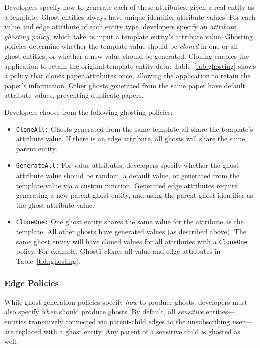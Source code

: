 Developers specify how to generate each of these attributes, given a real entity as a template.
Ghost entities always have unique identifier attribute values.
For each value and edge attribute of each entity type, developers specify an \emph{attribute ghosting policy},
which take as input a template entity's attribute value. Ghosting policies determine whether the
template value should be \emph{cloned} in one or all ghost entities, or whether
a new value should be generated. Cloning enables the application to retain
the original template entity data: Table~\ref{tab:ghosting} shows a policy that clones
paper attributes once, allowing the application to retain the paper's information. Other ghosts
generated from the same paper have default attribute values, preventing duplicate papers.

Developers choose from the following ghosting policies:
\begin{itemize}
    \item \texttt{CloneAll:} Ghosts generated from the same template all share the template's 
        attribute value. If there is an edge attribute, all ghosts will share the
        same parent entity.

    \item \texttt{GenerateAll:} 
        For value attributes, developers specify whether the ghost attribute value should be
        random, a default value, or generated from the template value via a custom function.
        Generated edge attributes require generating a new parent ghost entity, and using the parent ghost
        identifier as the ghost attribute value.

    \item \texttt{CloneOne:} One ghost entity shares the same value for the attribute as the
        template. All other ghosts have generated values (as described above).
        The same ghost entity will have cloned values for all attributes with a
        \texttt{CloneOne} policy. For example, Ghost1 clones all value and edge attributes in Table~\ref{tab:ghosting}.
\end{itemize}

\subsubsection{Edge Policies}
\label{design:edgepol}
While ghost generation policies specify \emph{how} to produce ghosts, developers must also specify
\emph{when} \sys should produce ghosts. 
By default, all \emph{sensitive} entities---entities transitively connected via
parent-child edges to the unsubscribing user---are replaced with a ghost entity. Any 
parent of a sensitive child is ghosted as well.

